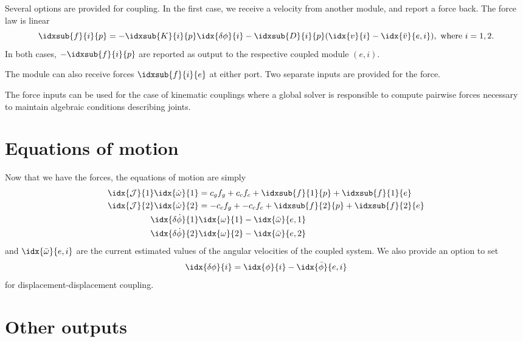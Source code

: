 \documentclass[10pt,notitlepage,abstracton]{scrartcl}
\theoremstyle{plain}
\theoremstyle{plain}
\theoremstyle{plain}
\begin{document}
Several options are provided for coupling.  In the first case, we receive a
velocity from another module, and report a force back.  The force law is
linear
\begin{equation}
  \label{eq:4}
  \idxsub{f}{i}{p} = - \idxsub{K}{i}{p}\idx{\delta\phi}{i} -
  \idxsub{D}{i}{p}(\idx{v}{i} -
  \idx{\bar{v}}{e,i}), \text{ where } i = 1,2.
\end{equation}
In both cases, $-\idxsub{f}{i}{p}$ are reported as output to the respective
coupled module $(e,i)$.  

The module can also receive forces $\idxsub{f}{i}{e}$ at either port. Two
separate inputs are provided for the force.

The force inputs can be used for the case of kinematic couplings where a
global solver is responsible to compute pairwise forces necessary to
maintain algebraic conditions describing joints. 

\section{Equations of motion}
\label{sec:equations-motion-1}

Now that we have the forces, the equations of motion are simply
\begin{equation}
  \label{eq:5}
  \begin{split}
    \idx{\mathcal{J}}{1}\idx{\dot{\omega}}{1} & = c_{g}f_{g} + c_{c}f_{c} +
    \idxsub{f}{1}{p} + \idxsub{f}{1}{e} \\
    \idx{\mathcal{J}}{2}\idx{\dot{\omega}}{2} & = -c_{c}f_{g} + -c_{c}f_{c} +
    \idxsub{f}{2}{p} + \idxsub{f}{2}{e} \\
    \idx{\delta\dot{\phi}}{1} & \idx{\omega}{1} - \idx{\bar{\omega}}{e,1} \\
    \idx{\delta\dot{\phi}}{2} & \idx{\omega}{2} - \idx{\bar{\omega}}{e,2} 
  \end{split}
\end{equation}
and $\idx{\bar{\omega}}{e,i}$ are the current estimated values of the
angular velocities of the coupled system.   We also provide an option to
set
\begin{equation}
  \label{eq:6}
  \idx{\delta\phi}{i}  = \idx{\phi}{i} - \idx{\bar{\phi}}{e,i}
\end{equation}
for displacement-displacement coupling.



\section{Other outputs}
\label{sec:other-outputs}
\end{document}
